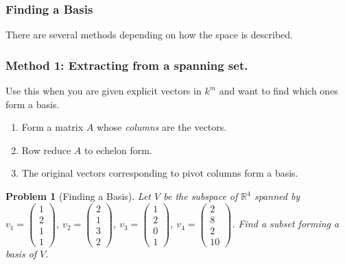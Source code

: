 \documentclass{article}
\newtheorem{problem}{Problem}
\begin{document}
\subsubsection{Finding a Basis}
There are several methods depending on how the space is described.
\subsubsection*{Method 1: Extracting from a spanning set.}
Use this when you are given explicit vectors in $k^m$ and want to find which ones form a basis.
\begin{enumerate}
    \item Form a matrix $A$ whose \emph{columns} are the vectors.
    \item Row reduce $A$ to echelon form.
    \item The original vectors corresponding to pivot columns form a basis.
\end{enumerate}
\begin{problem}[Finding a Basis]
    Let $V$ be the subspace of $\mathbb{R}^4$ spanned by $v_1=\begin{pmatrix}1\\2\\1\\1\end{pmatrix}$, $v_2=\begin{pmatrix}2\\1\\3\\2\end{pmatrix}$, $v_3=\begin{pmatrix}1\\2\\0\\1\end{pmatrix}$, $v_4=\begin{pmatrix}2\\8\\2\\10\end{pmatrix}$. Find a subset forming a basis of $V$.
\end{problem}
\end{document}
